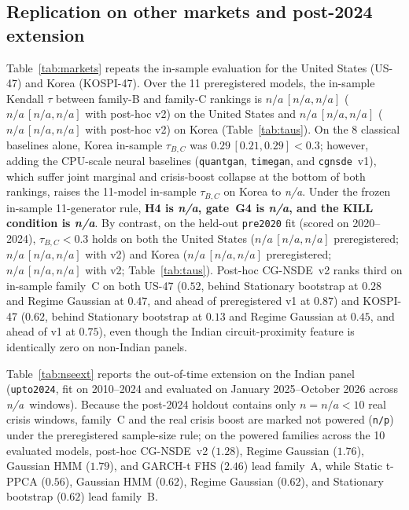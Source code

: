 \documentclass[journal]{IEEEtran}
\newcommand{\pendingnum}{\textit{n/a}}
\providecommand{\realNseExtWindows}{\pendingnum}
\providecommand{\realNseExtCrisis}{\pendingnum}
\providecommand{\tauBCusFull}{\pendingnum}
\providecommand{\tauBCusFullLo}{\pendingnum}
\providecommand{\tauBCusFullHi}{\pendingnum}
\providecommand{\tauBCusFullPrereg}{\pendingnum}
\providecommand{\tauBCusFullPreregLo}{\pendingnum}
\providecommand{\tauBCusFullPreregHi}{\pendingnum}
\providecommand{\tauBCusHeld}{\pendingnum}
\providecommand{\tauBCusHeldLo}{\pendingnum}
\providecommand{\tauBCusHeldHi}{\pendingnum}
\providecommand{\tauBCusHeldPrereg}{\pendingnum}
\providecommand{\tauBCusHeldPreregLo}{\pendingnum}
\providecommand{\tauBCusHeldPreregHi}{\pendingnum}
\providecommand{\tauBCkrFull}{\pendingnum}
\providecommand{\tauBCkrFullLo}{\pendingnum}
\providecommand{\tauBCkrFullHi}{\pendingnum}
\providecommand{\tauBCkrFullPrereg}{\pendingnum}
\providecommand{\tauBCkrFullPreregLo}{\pendingnum}
\providecommand{\tauBCkrFullPreregHi}{\pendingnum}
\providecommand{\tauBCkrHeld}{\pendingnum}
\providecommand{\tauBCkrHeldLo}{\pendingnum}
\providecommand{\tauBCkrHeldHi}{\pendingnum}
\providecommand{\tauBCkrHeldPrereg}{\pendingnum}
\providecommand{\tauBCkrHeldPreregLo}{\pendingnum}
\providecommand{\tauBCkrHeldPreregHi}{\pendingnum}
\providecommand{\verdictHFour}{\pendingnum}
\providecommand{\verdictGFour}{\pendingnum}
\providecommand{\verdictKILL}{\pendingnum}
\begin{document}
\subsection{Replication on other markets and post-2024 extension}
Table~\ref{tab:markets} repeats the in-sample evaluation for the United States (US-47) and Korea (KOSPI-47).
Over the 11 preregistered models, the in-sample Kendall $\tau$ between family-B and family-C rankings is
$\tauBCusFullPrereg\,[\tauBCusFullPreregLo,\tauBCusFullPreregHi]$ ($\tauBCusFull\,[\tauBCusFullLo,\tauBCusFullHi]$
with post-hoc v2) on the United States and $\tauBCkrFullPrereg\,[\tauBCkrFullPreregLo,\tauBCkrFullPreregHi]$
($\tauBCkrFull\,[\tauBCkrFullLo,\tauBCkrFullHi]$ with post-hoc v2) on Korea (Table~\ref{tab:taus}). On the 8
classical baselines alone, Korea in-sample $\tau_{B,C}$ was $0.29\,[0.21,0.29] < 0.3$; however, adding the
CPU-scale neural baselines (\texttt{quantgan}, \texttt{timegan}, and \texttt{cgnsde}~v1), which suffer joint
marginal and crisis-boost collapse at the bottom of both rankings, raises the 11-model in-sample $\tau_{B,C}$ on
Korea to \tauBCkrFullPrereg. Under the frozen in-sample 11-generator rule, \textbf{H4 is \verdictHFour, gate~G4
is \verdictGFour, and the \textbf{KILL} condition is \verdictKILL}. By contrast, on the held-out
\texttt{pre2020} fit (scored on 2020--2024), $\tau_{B,C} < 0.3$ holds on both the United States
($\tauBCusHeldPrereg\,[\tauBCusHeldPreregLo,\tauBCusHeldPreregHi]$ preregistered;
$\tauBCusHeld\,[\tauBCusHeldLo,\tauBCusHeldHi]$ with v2) and Korea
($\tauBCkrHeldPrereg\,[\tauBCkrHeldPreregLo,\tauBCkrHeldPreregHi]$ preregistered;
$\tauBCkrHeld\,[\tauBCkrHeldLo,\tauBCkrHeldHi]$ with v2; Table~\ref{tab:taus}). Post-hoc CG-NSDE~v2
ranks third on in-sample family~C on both US-47 ($0.52$, behind Stationary bootstrap at $0.28$ and Regime
Gaussian at $0.47$, and ahead of preregistered v1 at $0.87$) and KOSPI-47 ($0.62$, behind Stationary
bootstrap at $0.13$ and Regime Gaussian at $0.45$, and ahead of v1 at $0.75$), even though the Indian
circuit-proximity feature is identically zero on non-Indian panels.

Table~\ref{tab:nseext} reports the out-of-time extension on the Indian panel (\texttt{upto2024}, fit on
2010--2024 and evaluated on January 2025--October 2026 across \realNseExtWindows\ windows). Because the post-2024
holdout contains only $n=\realNseExtCrisis < 10$ real crisis windows, family~C and the real crisis boost are
marked not powered (\texttt{n/p}) under the preregistered sample-size rule; on the powered families across the
10 evaluated models, post-hoc CG-NSDE~v2 ($1.28$), Regime Gaussian ($1.76$), Gaussian HMM ($1.79$), and
GARCH-t FHS ($2.46$) lead family~A, while Static t-PPCA ($0.56$), Gaussian HMM ($0.62$), Regime Gaussian
($0.62$), and Stationary bootstrap ($0.62$) lead family~B.
\end{document}
